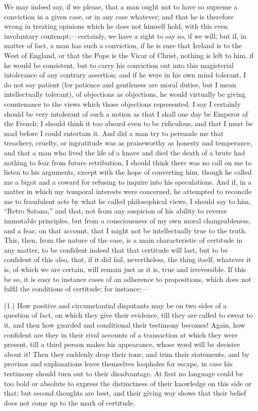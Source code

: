 We may indeed say, if we please, that a man ought not to have so
supreme a conviction in a given case, or in any case whatever; and
that he is therefore wrong in treating opinions which he does not
himself hold, with this even involuntary contempt;—certainly, we
have a right to say so, if we will; but if, in matter of fact, a man
has such a conviction, if he is sure that Ireland is to the West
of England, or that the Pope is the Vicar of Christ, nothing is left
to him, if he would be consistent, but to carry his conviction out
into this magisterial intolerance of any contrary assertion; and if he
were in his own mind tolerant, I do not say patient (for patience and
gentleness are moral duties, but I mean intellectually tolerant), of
objections as objections, he would virtually be giving countenance to
the views which those objections represented. I say I certainly should
be very intolerant of such a notion as that I shall one day be Emperor
of the French; I should think it too absurd even to be ridiculous, and
that I must be mad before I could entertain it. And did a man try to
persuade me that treachery, cruelty, or ingratitude was as
praiseworthy as honesty and temperance, and that a man who lived the
life of a knave and died the death of a brute had nothing to fear from
future retribution, I should think there was no call on me to listen
to his arguments, except with the hope of converting him, though he
called me a bigot and a coward for refusing to inquire into his
speculations. And if, in a matter in which my temporal interests were
concerned, he attempted to reconcile me to fraudulent acts by what he
called philosophical views, I should say to him, ``Retro Satana,''
and that, not from any suspicion of his ability to reverse immutable
principles, but from a consciousness of my own moral changeableness,
and a fear, on that account, that I might not be intellectually true
to the truth. This, then, from the nature of the case, is a main
characteristic of certitude in any matter, to be confident indeed that
that certitude will last, but to be confident of this also,
that, if it did fail, nevertheless, the thing itself, whatever it is,
of which we are certain, will remain just as it is, true and
irreversible. If this be so, it is easy to instance cases of an
adherence to propositions, which does not fulfil the conditions of
certitude; for instance:—

(1.) How positive and circumstantial disputants may be on two sides
of a question of fact, on which they give their evidence, till they
are called to swear to it, and then how guarded and conditional their
testimony becomes! Again, how confident are they in their rival
accounts of a transaction at which they were present, till a third
person makes his appearance, whose word will be decisive about it!
Then they suddenly drop their tone, and trim their statements, and by
provisos and explanations leave themselves loopholes for escape, in
case his testimony should turn out to their disadvantage. At first no
language could be too bold or absolute to express the distinctness of
their knowledge on this side or that; but second thoughts are best,
and their giving way shows that their belief does not come up to the
mark of certitude.


